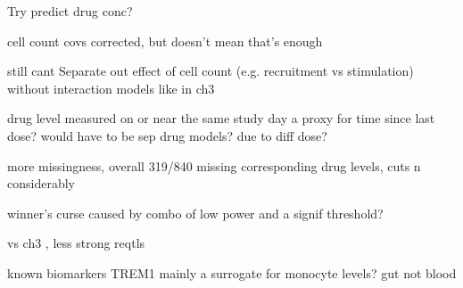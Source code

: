 \begin{outline}
Try predict drug conc?

cell count covs corrected, but doesn't mean that's enough

    still cant Separate out effect of cell count (e.g. recruitment vs stimulation)
    without interaction models like in ch3

drug level measured on or near the same study day
    a proxy for time since last dose?
    would have to be sep drug models?
        due to diff dose?

    more missingness, overall 319/840 missing corresponding drug levels, cuts n considerably



winner's curse caused by combo of low power and a signif threshold?

vs ch3 , less strong reqtls

known biomarkers
    TREM1 mainly a surrogate for monocyte levels?
    gut not blood


\end{outline}

